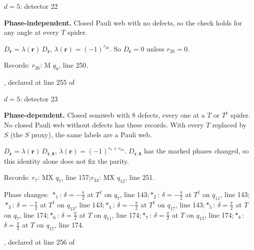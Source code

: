 \label{d5_det022}
{\Large $d=5$: detector 22}\par
\textbf{Phase-independent.} Closed Pauli web with no defects, so the check holds for any angle at every $T$ spider.
\begin{center}
\end{center}
\vspace{-1mm}
$D_{\boldsymbol r}=\lambda(\boldsymbol r)\,D_{\boldsymbol r}$, \quad $\lambda(\boldsymbol r)=(-1)^{r_{26}}$. \qquad So $D_{\boldsymbol r}=0$ unless $r_{26}=0$.
\par\smallskip\begin{minipage}{.98\linewidth}\small Records: $r_{26}$: M $q_{8}$, line 250.\end{minipage}
\vfill
{\footnotesize\texttt{}, declared at line 255 of \texttt{}}
\newpage

\label{d5_det023}
{\Large $d=5$: detector 23}\par
\textbf{Phase-dependent.} Closed semiweb with 8 defects, every one at a $T$ or $T^\dagger$ spider. No closed Pauli web without defects has these records. With every $T$ replaced by $S$ (the $S$ proxy), the same labels are a Pauli web.
\begin{center}
\end{center}
\vspace{-1mm}
$D_{\boldsymbol r}=\lambda(\boldsymbol r)\,D_{\boldsymbol r,\boldsymbol\delta}$, \quad $\lambda(\boldsymbol r)=(-1)^{r_{7}+r_{34}}$. \qquad $D_{\boldsymbol r,\boldsymbol\delta}$ has the marked phases changed, so this identity alone does not fix the parity.
\par\smallskip\begin{minipage}{.98\linewidth}\small Records: $r_{7}$: MX $q_{7}$, line 157;\quad $r_{34}$: MX $q_{12}$, line 251.\end{minipage}
\par\smallskip\begin{minipage}{.98\linewidth}\small Phase changes: $\ast_{1}$: $\delta=-\frac{\pi}{2}$ at $T^\dagger$ on $q_{7}$, line 143;\quad $\ast_{2}$: $\delta=-\frac{\pi}{2}$ at $T^\dagger$ on $q_{11}$, line 143;\quad $\ast_{3}$: $\delta=-\frac{\pi}{2}$ at $T^\dagger$ on $q_{13}$, line 143;\quad $\ast_{4}$: $\delta=-\frac{\pi}{2}$ at $T^\dagger$ on $q_{17}$, line 143;\quad $\ast_{5}$: $\delta=\frac{\pi}{2}$ at $T$ on $q_{7}$, line 174;\quad $\ast_{6}$: $\delta=\frac{\pi}{2}$ at $T$ on $q_{11}$, line 174;\quad $\ast_{7}$: $\delta=\frac{\pi}{2}$ at $T$ on $q_{13}$, line 174;\quad $\ast_{8}$: $\delta=\frac{\pi}{2}$ at $T$ on $q_{17}$, line 174.\end{minipage}
\vfill
{\footnotesize\texttt{}, declared at line 256 of \texttt{}}
\newpage

